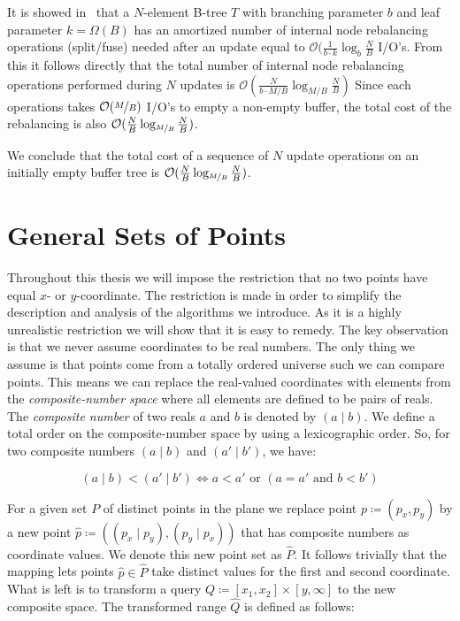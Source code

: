 \documentclass[twoside,11pt,openright]{report}
\begin{document}
It is showed in~\cite{ionote} that a $N$-element B-tree $T$ with branching parameter $b$ and leaf parameter $k = \Omega(B)$ has an amortized number of internal node rebalancing operations (split/fuse) needed after an update equal to $\mathcal{O}(\frac{1}{b \cdot k}\log_b \frac{N}{B}$ I/O's. From this it follows directly that the total number of internal node rebalancing operations performed during $N$ updates is $\mathcal{O}(\frac{N}{b \cdot M/B}\log_{M/B} \frac{N}{B})$ Since each operations takes $\mathcal{O}(\nicefrac{M}{B})$ I/O's to empty a non-empty buffer, the total cost of the rebalancing is also $\mathcal{O}(\frac{N}{B} \log_{\nicefrac{M}{B}} \frac{N}{B})$.

We conclude that the total cost of a sequence of $N$ update operations on an initially empty buffer tree is $\mathcal{O}(\frac{N}{B} \log_{\nicefrac{M}{B}} \frac{N}{B})$.

\section{General Sets of Points}
Throughout this thesis we will impose the restriction that no two points have equal $x$- or $y$-coordinate. The restriction is made in order to simplify the description and analysis of the algorithms we introduce. As it is a highly unrealistic restriction we will show that it is easy to remedy. The key observation is that we never assume coordinates to be real numbers. The only thing we assume is that points come from a totally ordered universe such we can compare points. This means we can replace the real-valued coordinates with elements from the \textit{composite-number space} where all elements are defined to be pairs of reals. The \textit{composite number} of two reals $a$ and $b$ is denoted by $(a \mid b)$. We define a total order on the composite-number space by using a lexicographic order. So, for two composite numbers $(a \mid b)$ and $(a' \mid b')$, we have:

$$ (a \mid b) < (a' \mid b') \Leftrightarrow a < a' \text{ or } (a = a' \text{ and } b < b') $$

For a given set $P$ of distinct points in the plane we replace point $p \coloneqq (p_x, p_y)$ by a new point $\hat{p} \coloneqq ((p_x \mid p_y),(p_y \mid p_x))$ that has composite numbers as coordinate values. We denote this new point set as $\hat{P}$. It follows trivially that the mapping lets points $\hat{p} \in \hat{P}$ take distinct values for the first and second coordinate. What is left is to transform a query $Q \coloneqq [x_1,x_2] \times [y,\infty]$ to the new composite space. The transformed range $\hat{Q}$ is defined as follows:
\end{document}
